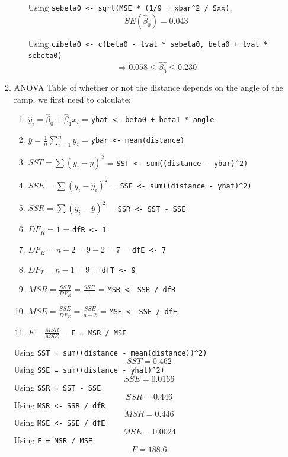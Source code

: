 \documentclass[12pt]{article}
\begin{document}
\begin{enumerate}[1.]
\begin{enumerate}
\begin{enumerate}
                Using \texttt{sebeta0 <- sqrt(MSE * (1/9 + xbar\^{}2 / Sxx)},
                \[ SE(\hat{\beta}_0) = 0.043 \]

                Using \texttt{cibeta0 <- c(beta0 - tval * sebeta0, beta0 + tval * sebeta0)}
                \[ \Rightarrow 0.058 \leq \hat{\beta_0} \leq 0.230 \]
            \end{enumerate}

            \item ANOVA Table of whether or not the distance depends on the angle of the ramp, we first need to calculate:
            \begin{enumerate}
                \item $\hat{y}_i = \hat{\beta}_0 + \hat{\beta}_1 x_i$ = \texttt{yhat <- beta0 + beta1 * angle}
                \item $\bar{y} = \frac{1}{n} \sum_{i=1}^{n} y_i$ = \texttt{ybar <- mean(distance)}
                \item $SST = \sum (y_i - \bar{y})^2$ = \texttt{SST <- sum((distance - ybar)\^{}2)}
                \item $SSE = \sum (y_i - \hat{y}_i)^2$ = \texttt{SSE <- sum((distance - yhat)\^{}2)}    
                \item $SSR = \sum (\hat{y}_i - \bar{y})^2$ = \texttt{SSR <- SST - SSE}
                \item $DF_R = 1$ = \texttt{dfR <- 1}
                \item $DF_E = n - 2 = 9 - 2 = 7 $ = \texttt{dfE <- 7}
                \item $DF_T = n - 1 = 9$ = \texttt{dfT <- 9}
                \item $MSR = \frac{SSR}{DF_R} = \frac{SSR}{1}$ = \texttt{MSR <- SSR / dfR}\
                \item $MSE = \frac{SSE}{DF_E} =  \frac{SSE}{n-2}$ = \texttt{MSE <- SSE / dfE}
                \item $F = \frac{MSR}{MSE}$ = \texttt{F = MSR / MSE}
            \end{enumerate}
            Using \texttt{SST = sum((distance - mean(distance))\^{}2)}
            \[ SST = 0.462 \]
            Using \texttt{SSE = sum((distance - yhat)\^{}2)}
            \[ SSE = 0.0166 \]
            Using \texttt{SSR = SST - SSE}
            \[ SSR = 0.446 \]   
            Using \texttt{MSR <- SSR / dfR}
            \[ MSR = 0.446 \]
            Using \texttt{MSE <- SSE / dfE}
            \[ MSE = 0.0024 \]
            Using \texttt{F = MSR / MSE}
            \[ F = 188.6 \]

\end{enumerate}
\end{enumerate}
\end{document}
